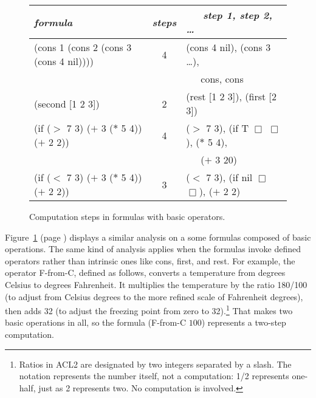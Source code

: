 \begin{figure}
\begin{center}
\begin{tabular}{lcl}
\hline
\hspace*{5mm}\emph{formula}                         &\emph{steps}&~~~\emph{step 1, step 2, \dots}\\ \hline
\textsf{(cons 1 (cons 2 (cons 3 (cons 4 nil))))}    &     4      &\textsf{(cons 4 nil)}, \textsf{(cons 3 \dots)},\\
                                                    &            &~~~\textsf{cons}, \textsf{cons}\\
\textsf{(second [1 2 3])}                           &     2      &\textsf{(rest [1 2 3])}, \textsf{(first [2 3])}\\
\textsf{(if ($>$ 7 3) ($+$ 3 ($*$ 5 4)) ($+$ 2 2))} &     4      &\textsf{($>$ 7 3)}, \textsf{(if T $\Box$ $\Box$)}, \textsf{($*$ 5 4)},\\
                                                    &            &~~~\textsf{($+$ 3 20)}\\
\textsf{(if ($<$ 7 3) ($+$ 3 ($*$ 5 4)) ($+$ 2 2))} &     3      &\textsf{($<$ 7 3)}, \textsf{(if nil $\Box$ $\Box$)}, \textsf{($+$ 2 2)}\\
\end{tabular}
\end{center}
\caption{Computation steps in formulas with basic operators.}
\label{fig:basic-op-formulas}
\end{figure}

Figure~\ref{fig:basic-op-formulas} (page \pageref{fig:basic-op-formulas})
displays a similar analysis on a some formulas
composed of basic operations. The same kind of
analysis applies when the formulas invoke defined operators
rather than intrinsic ones like
\textsf{cons}, \textsf{first}, and \textsf{rest}.
For example, the operator \textsf{F-from-C}, defined
as follows, converts a temperature from degrees Celsius to
degrees Fahrenheit. It multiplies the temperature by the ratio \textsf{180/100}
(to adjust from Celsius degrees to the
more refined scale of Fahrenheit degrees), then adds 32
(to adjust the freezing point from zero to 32).\footnote{Ratios
in ACL2 are designated
by two integers separated by a slash.
The notation represents the number itself, not a computation:
\textsf{1/2} represents one-half, just as \textsf{2} represents two.
No computation is involved.}
That makes two basic operations in all, so the formula
\textsf{(F-from-C $100$)} represents a two-step computation.

